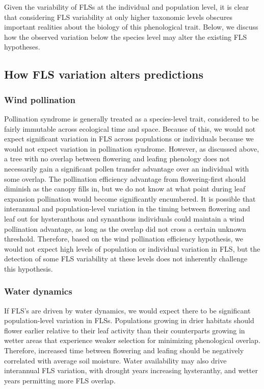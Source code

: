 \documentclass[12pt]{article}
\begin{document}
\indent Given the variability of FLSs at the individual and population level, it is clear that considering FLS variability at only higher taxonomic levels obscures important realities about the biology of this phenological trait. Below, we discuss how the observed variation below the species level may alter the existing FLS hypotheses.

\subsection*{How FLS variation alters predictions}
\subsubsection*{Wind pollination} 
\indent\indent  Pollination syndrome is generally treated as a species-level trait, considered to be fairly immutable across ecological time and space. Because of this, we would not expect significant variation in FLS across populations or individuals because we would not expect variation in pollination syndrome. However, as discussed above, a tree with no overlap between flowering and leafing phenology does not necessarily gain a significant pollen transfer advantage over an individual with some overlap. The pollination efficiency advantage from flowering-first should diminish as the canopy fills in, but  we do not know at what point during leaf expansion pollination would become significantly encumbered. It is possible that interannual and population-level variation in the timing between flowering and leaf out for hysteranthous and synanthous individuals could maintain a wind pollination advantage, as long as the overlap did not cross a certain unknown threshold. Therefore, based on the wind pollination efficiency hypothesis, we would not expect high levels of population or individual variation in FLS, but the detection of some FLS variability at these levels does not inherently challenge this hypothesis.
\subsubsection*{Water dynamics} 
\indent\indent If FLS's are driven by water dynamics, we would expect there to be significant population-level variation in FLSs. Populations growing in drier habitats should flower earlier relative to their leaf activity than their counterparts growing in wetter areas that experience weaker selection for minimizing phenological overlap. Therefore, increased time between flowering and leafing should be negatively correlated with average soil moisture. Water availability may also drive interannual FLS variation, with drought years increasing hysteranthy, and wetter years permitting more FLS overlap. 
\end{document}
